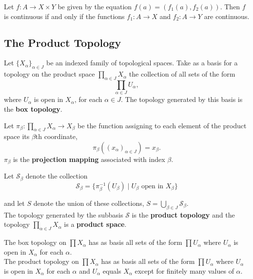 \begin{theorem}
Let $f \colon A \rightarrow X \times Y$ be given by the equation $f(a) = (f_1(a), f_2(a))$. Then $f$ is continuous if and only if the functions
$f_1 \colon A \rightarrow X$ and $f_2\colon A \rightarrow Y$ are continuous.
\end{theorem}

\subsection{The Product Topology}

\begin{definition}
Let $\{ X_\alpha \}_{\alpha \in J}$ be an indexed family of topological spaces. Take as a basis for a topology on the product space $\prod _{\alpha \in J} X_\alpha$ the collection of all sets of the form
\[
    \prod_{\alpha \in J} U_\alpha,
\]
where $U_\alpha$ is open in $X_\alpha$, for each $\alpha \in J$. The topology generated by this basis is the \textbf{box topology}.
\end{definition}

\begin{definition}
Let $\pi_{\beta} \colon  \prod _{\alpha \in J} X_\alpha \rightarrow X_\beta$ be the function assigning to each element of the product space its $\beta$th coordinate, 
\[
    \pi _\beta((x_\alpha)_{\alpha \in J}) = x_\beta.
\]
$\pi_\beta$ is the \textbf{projection mapping} associated with index $\beta$.
\end{definition}

\begin{definition}
Let $\mathscr{S}_\beta$ denote the collection
\[
    \mathscr{S}_\beta = \{ \pi _\beta^{-1} (U_\beta) \mid U_\beta \text{ open in $X_\beta$}\} 
\]

and let $S$ denote the union of these collections, $S = \bigcup_{\beta \in J} \mathscr{S}_\beta$. \\

The topology generated by the subbasis $\mathscr{S}$ is the \textbf{product topology} and the topology $\prod_{\alpha \in J} X_\alpha$ is a \textbf{product space}. 
\end{definition}

\begin{theorem}
The box topology on $\prod X_\alpha$ has as basis all sets of the form $\prod  U_\alpha$ where $U_\alpha$ is open in $X_\alpha$ for each $\alpha$. \\

The product topology on $\prod X_\alpha$ has as basis all sets of the form $\prod  U_\alpha$ where $U_\alpha$ is open in $X_\alpha$ for each $\alpha$ and $U_\alpha$ equals $X_\alpha$ except for finitely many values of $\alpha$.
\end{theorem}

